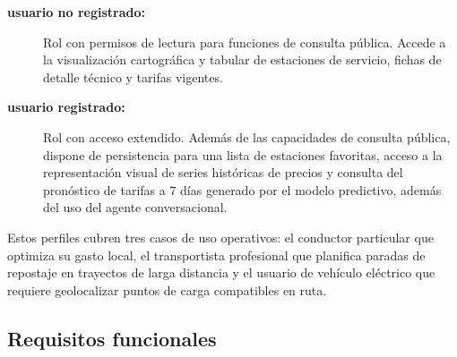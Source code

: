 \begin{description}
  \item[\textbf{usuario no registrado:}] Rol con permisos de lectura para funciones de consulta pública.
        Accede a la visualización cartográfica y tabular de estaciones de servicio, fichas de detalle técnico y tarifas vigentes.
  \item[\textbf{usuario registrado:}] Rol con acceso extendido. Además de las capacidades de consulta pública,
        dispone de persistencia para una lista de estaciones favoritas, acceso a la representación visual de series
        históricas de precios y consulta del pronóstico de tarifas a 7 días generado por el modelo predictivo, además del uso del agente conversacional.
\end{description}

Estos perfiles cubren tres casos de uso operativos: el conductor particular que optimiza su gasto local,
el transportista profesional que planifica paradas de repostaje en trayectos de larga distancia y
el usuario de vehículo eléctrico que requiere geolocalizar puntos de carga compatibles en ruta.

\subsection{Requisitos funcionales}
\label{subsec:requisitos_funcionales}

